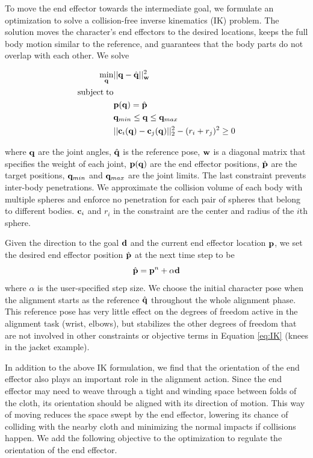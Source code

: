 To move the end effector towards the intermediate goal, we formulate an
optimization to solve a collision-free inverse kinematics (IK) problem.
The solution moves the character's end effectors to the desired locations,
keeps the full body motion similar to the reference, and guarantees that
the body parts do not overlap with each other. We solve

\begin{align}
\label{eq:IK}
  \min_{\mathbf{q}} & ||\mathbf{q} - \hat{\mathbf{q}}||_{\mathbf{w}}^2 \\
  \nonumber  \mathrm{subject\;} \mathrm{to} & \\
  \nonumber  &\mathbf{p}(\mathbf{q}) = \hat{\mathbf{p}}\\
  \nonumber   &\mathbf{q}_{min} \leq \mathbf{q} \leq \mathbf{q}_{max}\\
  \nonumber   &||\mathbf{c}_i(\mathbf{q}) - \mathbf{c}_j(\mathbf{q})||_2^2 - (r_i + r_j)^2 \geq 0
\end{align}

where $\mathbf{q}$ are the joint angles, $\hat{\mathbf{q}}$ is the reference pose, $\mathbf{w}$ is a diagonal matrix that specifies the weight of each joint, $\mathbf{p}(\mathbf{q})$ are the end effector positions, $\hat{\mathbf{p}}$ are the target positions, $\mathbf{q}_{min}$ and $\mathbf{q}_{max}$ are the joint limits. The last constraint prevents inter-body penetrations. We approximate the collision volume of each body with multiple spheres and enforce no penetration for each pair of spheres that belong to different bodies. $\mathbf{c}_i$ and $r_i$ in the constraint are the center and radius of the $i$th sphere.

Given the direction to the goal $\mathbf{d}$ and the current end effector location $\mathbf{p}$, we set the desired end effector position $\hat{\mathbf{p}}$ at the next time step to be
\begin{equation}
  \hat{\mathbf{p}} = \mathbf{p}^n+\alpha\mathbf{d}
  \label{eq:target}
\end{equation}
where $\alpha$ is the user-specified step size. We choose the initial character pose when the alignment starts as the reference $\hat{\mathbf{q}}$ throughout the whole alignment phase. This reference pose has very little effect on the degrees of freedom active in the alignment task (\eg wrist, elbows), but stabilizes the other degrees of freedom that are not involved in other constraints or objective terms in Equation \ref{eq:IK} (\eg knees in the jacket example).

In addition to the above IK formulation, we find that the orientation of the end effector also plays an important role in the alignment action. Since the end effector may need to weave through a tight and winding space between folds of the cloth, its orientation should be aligned with its direction of motion. This way of moving reduces the space swept by the end effector, lowering its chance of colliding with the nearby cloth and minimizing the normal impacts if collisions happen. We add the following objective to the optimization to regulate the orientation of the end effector.

